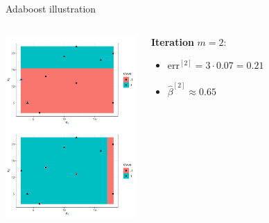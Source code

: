 \begin{vbframe}{Adaboost illustration}
\begin{columns}
\includegraphics[width=5cm]{figure_man/adaboost_viz_mlr_2.png}



\column{7cm}

\begin{footnotesize}
 {

\textbf{Iteration} $m = 2$:
\begin{itemize}
  \item $\text{err}^{[2]} = 3 \cdot 0.07 = 0.21$ 
  \item $\hat{\beta}^{[2]} \approx 0.65$
\end{itemize}

}
\end{footnotesize}
\end{columns}
\end{vbframe}
